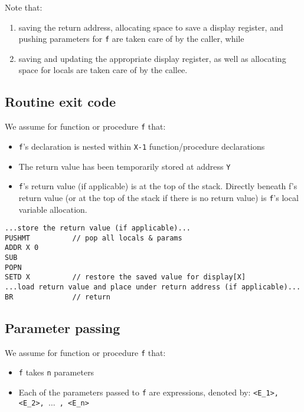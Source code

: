 \documentclass[11pt]{article}
\begin{document}
Note that:
\begin{enumerate}[label=(\arabic*)]
\item saving the return address, allocating space to save a display register, and pushing parameters for \texttt{f} are taken care of by the caller, while
\item saving and updating the appropriate display register, as well as allocating space for locals are taken care of by the callee.
\end{enumerate}

\subsection{Routine exit code}

We assume for function or procedure \texttt{f} that:
    \begin{itemize}
    \item   \texttt{f}'s declaration is nested within \texttt{X-1} function/procedure declarations
    \item The return value has been temporarily stored at address \texttt{Y}
    \item \texttt{f}'s return value (if applicable) is at the top of the stack. Directly beneath f's return value (or at the top of the stack if there is no return value) is \texttt{f}'s local variable allocation.
    \end{itemize}

\begin{verbatim}
...store the return value (if applicable)...
PUSHMT          // pop all locals & params
ADDR X 0
SUB
POPN
SETD X          // restore the saved value for display[X]
...load return value and place under return address (if applicable)...
BR              // return
\end{verbatim}

\subsection{Parameter passing}

We assume for function or procedure \texttt{f} that:
    \begin{itemize}
    \item \texttt{f} takes \texttt{n} parameters
    \item Each of the parameters passed to \texttt{f} are expressions, denoted by: \texttt{<E\_1>, <E\_2>, $\ldots$ , <E\_n>}
    \end{itemize}
\end{document}
